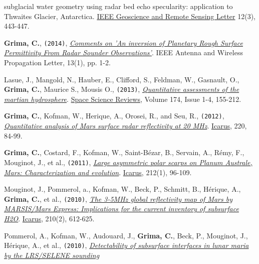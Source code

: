\begin{etaremune}
{{  subglacial water geometry using radar bed echo specularity:
  application to Thwaites Glacier, Antarctica}.} \ul{IEEE Geoscience and
  Remote Sensing Letter} 12(3), 443-447.
\item
  \textbf{Grima, C.}, \texttt{(2014)}, \emph{\href{http://ieeexplore.ieee.org/xpl/articleDetails.jsp?tp=\&arnumber=6827185\&queryText\%3Dgrima}{Comments on 'An inversion of Planetary Rough Surface Permittivity From Radar Sounder Observations'}}. IEEE Antenna and Wireless Propagation Letter, 13(1), pp. 1-2.
\item
  Lasue, J., Mangold, N., Hauber, E., Clifford, S., Feldman, W.,
  Gasnault, O., \textbf{Grima, C.}, Maurice S., Mousis O.,
  \texttt{(2013)},
  \emph{\href{http://www.ig.utexas.edu/pubs/scripts/readpdf.php?contrib=2628}{Quantitative
  assessments of the martian hydrosphere}}. \ul{Space Science Reviews},
  Volume 174, Issue 1-4, 155-212.
\item
  \textbf{Grima, C.}, Kofman, W., Herique, A., Orosei, R., and Seu, R.,
  \texttt{(2012)},
  \href{http://www.sciencedirect.com/science/article/pii/S0019103512001558}{\emph{Quantitative
  analysis of Mars surface radar reflectivity at 20 MHz}}. \ul{Icarus}, 220,
  84-99.
\item
  \textbf{Grima, C.}, Costard, F., Kofman, W., Saint-Bézar, B., Servain,
  A., Rémy, F., Mouginot, J., et al., \texttt{(2011)},
  \href{http://www.sciencedirect.com/science/article/pii/S0019103510004859}{\emph{Large
  asymmetric polar scarps on Planum Australe, Mars: Characterization and
  evolution}}. \ul{Icarus}, 212(1), 96-109.
\item
  Mouginot, J., Pommerol, a., Kofman, W., Beck, P., Schmitt, B.,
  Hérique, A., \textbf{Grima, C.}, et al., \texttt{(2010)},
  \href{https://www.google.com/url?sa=t\&rct=j\&q=\&esrc=s\&source=web\&cd=1\&cad=rja\&ved=0CDAQFjAA\&url=http\%3A\%2F\%2Fess.uci.edu\%2Fresearchgrp\%2Ferignot\%2Ffiles\%2Fmouginot_icarus_2010.pdf\&ei=j6inUdytH5HA9QSNx4FQ\&usg=AFQjCNHiVV4-tjSgM28QWYY64vKaSa2U4Q\&sig2=fGYDJTm_cOpv0rwZIGDX6A\&bvm=bv.47244034,d.eWU}{
  \emph{The 3-5MHz global reflectivity map of Mars by MARSIS/Mars
  Express: Implications for the current inventory of subsurface H2O}}.
  \ul{Icarus}, 210(2), 612-625.
\item
  Pommerol, A., Kofman, W., Audouard, J., \textbf{Grima, C.}, Beck, P.,
  Mouginot, J., Hérique, A., et al., \texttt{(2010)},
  \href{http://onlinelibrary.wiley.com/doi/10.1029/2009GL041681/abstract}{\emph{Detectability
  of subsurface interfaces in lunar maria by the LRS/SELENE sounding
}}
\end{etaremune}
